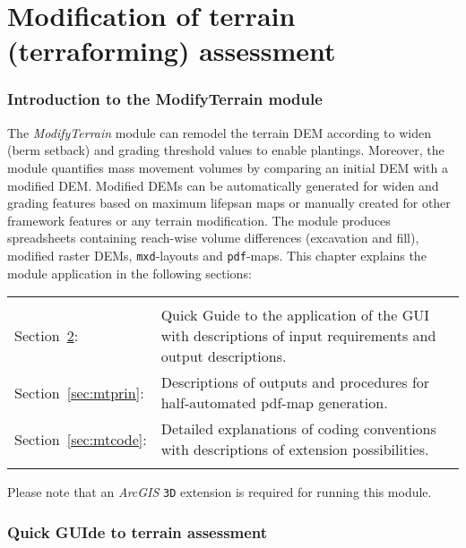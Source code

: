 \newpage
\part{Modification of terrain (terraforming) assessment} \label{part:mt}

\section{Introduction to the ModifyTerrain module} \label{sec:mtintro}
The \textit{ModifyTerrain} module can remodel the terrain DEM according to widen (berm setback) and grading threshold values to enable plantings. Moreover, the module quantifies mass movement volumes by comparing an initial DEM with a modified DEM. Modified DEMs can be automatically generated for widen and grading features based on maximum lifepsan maps or manually created for other framework features or any terrain modification. The module produces spreadsheets containing reach-wise volume differences (excavation and fill), modified raster DEMs, \texttt{mxd}-layouts and \texttt{pdf}-maps. This chapter explains the module application in the following sections:\\
\begin{tabular}{l L{0.9\textwidth}}
\\
Section~\ref{sec:mtquick}: & Quick Guide to the application of the GUI with descriptions of input requirements and output descriptions.\\
Section~\ref{sec:mtprin}:  & Descriptions of outputs and procedures for half-automated pdf-map generation.\\
Section~\ref{sec:mtcode}:  & Detailed explanations of coding conventions with descriptions of extension possibilities.\\
\\
\end{tabular}

Please note that an \textit{ArcGIS} \texttt{3D} extension is required for running this module.

\section{Quick GUIde to terrain assessment} \label{sec:mtquick}
